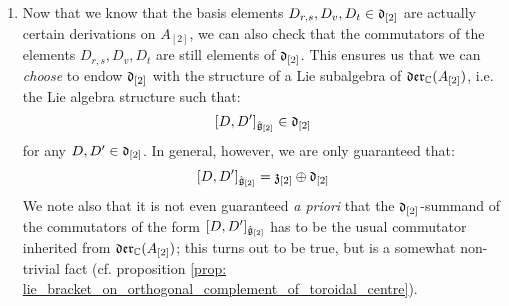 \begin{remark}
\begin{enumerate}
                \item Now that we know that the basis elements $D_{r, s}, D_v, D_t \in \mathfrak{d}_{[2]}$ are actually certain derivations on $A_{[2]}$, we can also check that the commutators of the elements $D_{r, s}, D_v, D_t$ are still elements of $\mathfrak{d}_{[2]}$. This ensures us that we can \textit{choose} to endow $\mathfrak{d}_{[2]}$ with the structure of a Lie subalgebra of $\mathfrak{der}_{\mathbb{C}}(A_{[2]})$, i.e. the Lie algebra structure such that:
                    $$[D, D']_{\hat{\mathfrak{g}}_{[2]}} \in \mathfrak{d}_{[2]}$$
                for any $D, D' \in \mathfrak{d}_{[2]}$. In general, however, we are only guaranteed that:
                    $$[D, D']_{\hat{\mathfrak{g}}_{[2]}} = \mathfrak{z}_{[2]} \oplus \mathfrak{d}_{[2]}$$
                We note also that it is not even guaranteed \textit{a priori} that the $\mathfrak{d}_{[2]}$-summand of the commutators of the form $[D, D']_{\hat{\mathfrak{g}}_{[2]}}$ has to be the usual commutator inherited from $\mathfrak{der}_{\mathbb{C}}(A_{[2]})$; this turns out to be true, but is a somewhat non-trivial fact (cf. proposition \ref{prop: lie_bracket_on_orthogonal_complement_of_toroidal_centre}). 
            \end{enumerate}
        \end{remark}
        
